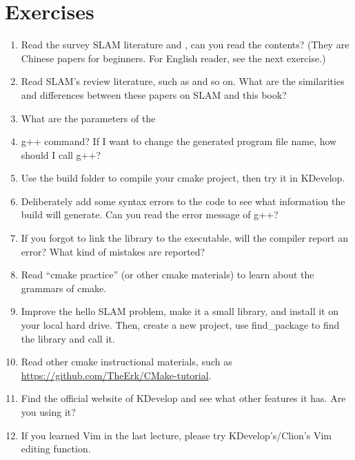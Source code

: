 \section*{Exercises}
\begin{enumerate}
    \item Read the survey SLAM literature \cite{Liu2016} and \cite{Liang2013}, can you read the contents? (They are Chinese papers for beginners. For English reader, see the next  exercise.)
    \item[\optional] Read SLAM's review literature, such as \cite{Cadena2016, Fuentes-Pacheco2015, Boal2014, Chen2012, Chen2007} and so on. What are the similarities and differences between these papers on SLAM and this book?
    \item What are the parameters of the \item g++ command? If I want to change the generated program file name, how should I call g++?
    \item Use the build folder to compile your cmake project, then try it in KDevelop.
    \item Deliberately add some syntax errors to the code to see what information the build will generate. Can you read the error message of g++?
    \item If you forgot to link the library to the executable, will the compiler report an error? What kind of mistakes are reported?
    \item[\optional] Read ``cmake practice'' (or other cmake materials) to learn about the grammars of cmake.
    \item[\optional] Improve the hello SLAM problem, make it a small library, and install it on your local hard drive. Then, create a new project, use find\_package to find the library and call it.
    \item[\optional] Read other cmake instructional materials, such as \url{https://github.com/TheErk/CMake-tutorial}.
    \item Find the official website of KDevelop and see what other features it has. Are you using it?
    \item If you learned Vim in the last lecture, please try KDevelop's/Clion's Vim editing function.
\end{enumerate}